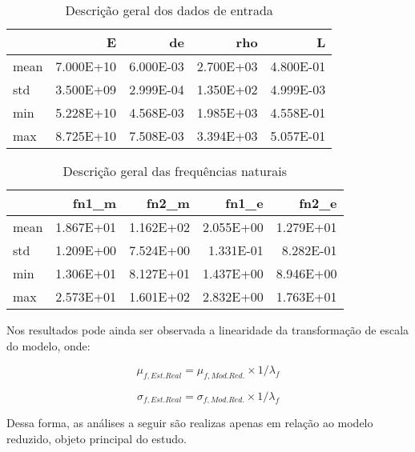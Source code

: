     
    \begin{table}[H]
    \centering
    \caption{Descrição geral dos dados de entrada}
    {\begin{tabular}{lrrrr}
\toprule
{} &         E &        de &       rho &         L \\
\midrule
mean & 7.000E+10 & 6.000E-03 & 2.700E+03 & 4.800E-01 \\
std  & 3.500E+09 & 2.999E-04 & 1.350E+02 & 4.999E-03 \\
min  & 5.228E+10 & 4.568E-03 & 1.985E+03 & 4.558E-01 \\
max  & 8.725E+10 & 7.508E-03 & 3.394E+03 & 5.057E-01 \\
\bottomrule
\end{tabular}
}
    \label{tab:descE}
    \end{table}
    

    
    
    \begin{table}[H]
    \centering
    \caption{Descrição geral das frequências naturais}
    {\begin{tabular}{lrrrr}
\toprule
{} &     fn1\_m &     fn2\_m &     fn1\_e &     fn2\_e \\
\midrule
mean & 1.867E+01 & 1.162E+02 & 2.055E+00 & 1.279E+01 \\
std  & 1.209E+00 & 7.524E+00 & 1.331E-01 & 8.282E-01 \\
min  & 1.306E+01 & 8.127E+01 & 1.437E+00 & 8.946E+00 \\
max  & 2.573E+01 & 1.601E+02 & 2.832E+00 & 1.763E+01 \\
\bottomrule
\end{tabular}
}
    \label{tab:descf}
    \end{table}
    

    
    Nos resultados pode ainda ser observada a linearidade da transformação
de escala do modelo, onde:

\begin{equation}
\mu_{f,Est. Real} = \mu_{f, Mod. Red.} \times 1/\lambda_f
\end{equation}

\begin{equation}
\sigma_{f, Est. Real} = \sigma_{f, Mod. Red.} \times 1/\lambda_f
\end{equation}

    Dessa forma, as análises a seguir são realizas apenas em relação ao
modelo reduzido, objeto principal do estudo.

